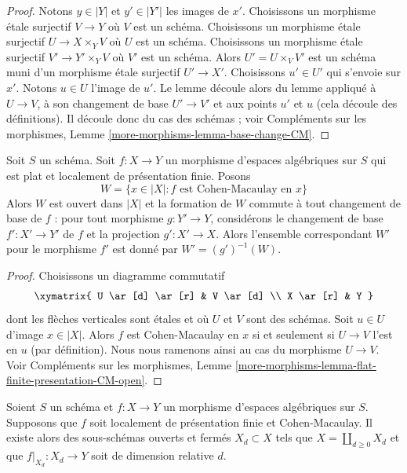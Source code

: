 \begin{proof}
Notons $y \in |Y|$ et $y' \in |Y'|$ les images de $x'$.
Choisissons un morphisme étale surjectif $V \to Y$ où $V$ est un schéma.
Choisissons un morphisme étale surjectif $U \to X \times_Y V$ où
$U$ est un schéma.
Choisissons un morphisme étale surjectif $V' \to Y' \times_Y V$
où $V'$ est un schéma.
Alors $U' = U \times_V V'$ est un schéma muni
d'un morphisme étale surjectif $U' \to X'$.
Choisissons $u' \in U'$ qui s'envoie sur $x'$. Notons $u \in U$ l'image de $u'$.
Le lemme découle alors du lemme appliqué à
$U \to V$, à son changement de base $U' \to V'$ et aux
points $u'$ et $u$ (cela découle des définitions).
Il découle donc du cas des schémas ; voir
Compléments sur les morphismes, Lemme \ref{more-morphisms-lemma-base-change-CM}.
\end{proof}

\begin{lemma}
\label{lemma-flat-finite-presentation-CM-open}
Soit $S$ un schéma.
Soit $f : X \to Y$ un morphisme d'espaces algébriques sur $S$
qui est plat et localement de présentation finie. Posons
$$
W = \{x \in |X| : f\text{ est Cohen-Macaulay en }x\}
$$
Alors $W$ est ouvert dans $|X|$ et la formation de $W$
commute à tout changement de base de $f$ :
pour tout morphisme $g : Y' \to Y$, considérons
le changement de base $f' : X' \to Y'$ de $f$ et la
projection $g' : X' \to X$. Alors l'ensemble correspondant
$W'$ pour le morphisme $f'$ est donné par $W' = (g')^{-1}(W)$.
\end{lemma}

\begin{proof}
Choisissons un diagramme commutatif
$$
\xymatrix{
U \ar[d] \ar[r] & V \ar[d] \\
X \ar[r] & Y
}
$$
dont les flèches verticales sont étales et où $U$ et $V$ sont des schémas.
Soit $u \in U$ d'image $x \in |X|$.
Alors $f$ est Cohen-Macaulay en $x$ si et seulement si $U \to V$ l'est
en $u$ (par définition).
Nous nous ramenons ainsi au cas du morphisme $U \to V$.
Voir Compléments sur les morphismes, Lemme
\ref{more-morphisms-lemma-flat-finite-presentation-CM-open}.
\end{proof}

\begin{lemma}
\label{lemma-lfp-CM-relative-dimension}
Soient $S$ un schéma et $f : X \to Y$ un
morphisme d'espaces algébriques sur $S$. Supposons que
$f$ soit localement de présentation finie et Cohen-Macaulay.
Il existe alors des sous-schémas ouverts et fermés $X_d \subset X$
tels que $X = \coprod_{d \geq 0} X_d$ et que $f|_{X_d} : X_d \to Y$
soit de dimension relative $d$.
\end{lemma}

